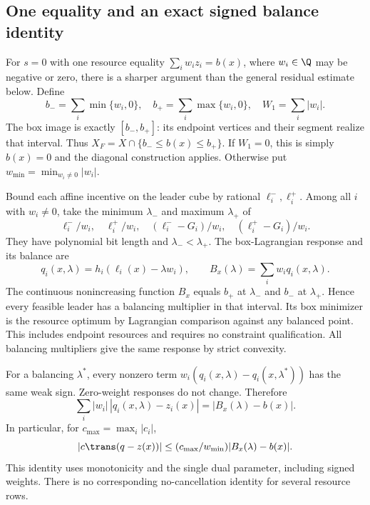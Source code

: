 \subsection{One equality and an exact signed balance identity}
\label{subsec:accuracy-one-resource}

For $s=0$ with one resource equality $\sum_iw_iz_i=b(x)$, where
$w_i\in\Q$ may be negative or zero, there is a sharper argument than
the general residual estimate below. Define
\[
 b_-=\sum_i\min\{w_i,0\},\quad b_+=\sum_i\max\{w_i,0\},\quad
 W_1=\sum_i|w_i|.
\]
The box image is exactly $[b_-,b_+]$: its endpoint vertices and their
segment realize that interval. Thus $X_F=X\cap\{b_-\le b(x)\le b_+\}$.
If $W_1=0$, this is simply $b(x)=0$ and the diagonal construction
applies. Otherwise put $w_{\min}=\min_{w_i\ne0}|w_i|$.

Bound each affine incentive on the leader cube by rational
$\ell_i^-,\ell_i^+$. Among all $i$ with $w_i\ne0$, take the minimum
$\lambda_-$ and maximum $\lambda_+$ of
\[
 \ell_i^-/w_i,\quad\ell_i^+/w_i,\quad
 (\ell_i^--G_i)/w_i,\quad(\ell_i^+-G_i)/w_i.
\]
They have polynomial bit length and $\lambda_-<\lambda_+$.
The box-Lagrangian response and its balance are
\[
 q_i(x,\lambda)=h_i(\ell_i(x)-\lambda w_i),\qquad
 B_x(\lambda)=\sum_iw_iq_i(x,\lambda).
\]
The continuous nonincreasing function $B_x$ equals $b_+$ at
$\lambda_-$ and $b_-$ at $\lambda_+$. Hence every feasible leader
has a balancing multiplier in that interval. Its box minimizer is the
resource optimum by Lagrangian comparison against any balanced point.
This includes endpoint resources and requires no constraint qualification.
All balancing multipliers give the same response by strict convexity.

For a balancing $\lambda^*$, every nonzero term
$w_i(q_i(x,\lambda)-q_i(x,\lambda^*))$ has the same weak sign.
Zero-weight responses do not change. Therefore
\begin{equation}\label{eq:signed-balance-identity}
 \sum_i|w_i|\,|q_i(x,\lambda)-z_i(x)|
                         =|B_x(\lambda)-b(x)|.
\end{equation}
In particular, for $c_{\max}=\max_i|c_i|$,
\[
 |c\trans(q-z(x))|\le(c_{\max}/w_{\min})|B_x(\lambda)-b(x)|.
\]
This identity uses monotonicity and the single dual parameter, including
signed weights. There is no corresponding no-cancellation identity for
several resource rows.

